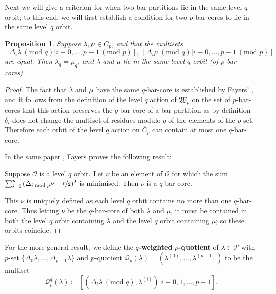 \documentclass[10pt]{amsart}
\newtheorem{prop}{Proposition}[section]
\begin{document}
Next we will give a criterion for when two bar partitions lie in the same level $q$ orbit; to this end, we will first establish a condition for two $p$-bar-cores to lie in the same level $q$ orbit.

\begin{prop}\label{prop7} 
Suppose $\lambda,\mu\in\overline{C}_p$, and that the multisets 
$$[\Delta_i\lambda\:(\text{mod }q)|i\equiv0,\dots,p-1\:(\text{mod }p)],\:[\Delta_i\mu\:(\text{mod }q)|i\equiv0,\dots,p-1\:(\text{mod }p)]$$
are equal. Then $\overline{\lambda}_q=\overline{\mu}_q$, and $\lambda$ and $\mu$ lie in the same level $q$ orbit \textup{(}of $p$-bar-cores\textup{)}. 
\end{prop}
\begin{proof}
The fact that $\lambda$ and $\mu$ have the same $q$-bar-core is established by Fayers' \cite[Proposition 4.1]{F3}, and it follows from the definition of the level $q$ action of $\mathfrak{W}_p$ on the set of $p$-bar-cores that this action preserves the $q$-bar-core of a bar partition as by definition $\delta_i$ does not change the multiset of residues modulo $q$ of the elements of the $p$-set. Therefore each orbit of the level $q$ action on $\overline{C}_p$ can contain at most one $q$-bar-core. 

In the same paper \cite{F3}, Fayers proves the following result: 
\begin{center}
Suppose $\mathcal{O}$ is a level $q$ orbit. Let $\nu$ be an element of $\mathcal{O}$ for which the sum $\sum^{p-1}_{i=0}(\Delta_{i\bmod p}\nu-\nicefrac{p}{2})^2$ is minimised. Then $\nu$ is a $q$-bar-core. 
\end{center}
This $\nu$ is uniquely defined as each level $q$ orbit contains no more than one $q$-bar-core. Thus letting $\nu$ be the $q$-bar-core of both $\lambda$ and $\mu$, it must be contained in both the level $q$ orbit containing $\lambda$ and the level $q$ orbit containing $\mu$; so these orbits coincide. 
\end{proof}

For the more general result, we define the $q$\textbf{-weighted} $p$\textbf{-quotient} of $\lambda\in\overline{\mathcal{P}}$ with $p$-set $\{\Delta_0\lambda,\dots,\Delta_{p-1}\lambda\}$ and $p$-quotient $\mathcal{Q}_p(\lambda)=(\lambda^{(0)},\dots,\lambda^{(p-1)})$ to be the multiset 
$$\mathcal{Q}^q_p(\lambda)\coloneqq[(\Delta_i\lambda\:(\text{mod }q),\lambda^{(i)})|i\equiv0,1,\dots,p-1].$$ 

\end{document}
